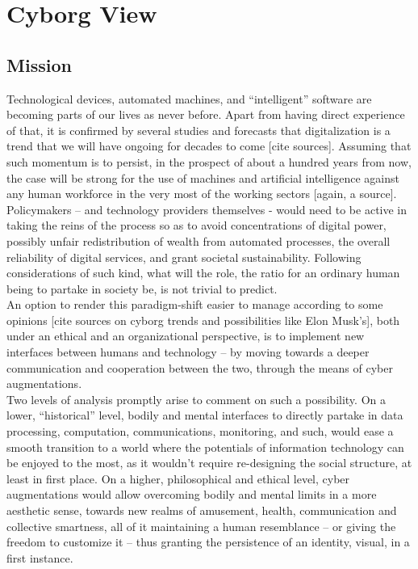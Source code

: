\chapter*{Cyborg View}
\label{cha:cyborg}

\section*{Mission}
\label{sec:mission}

Technological devices, automated machines, and “intelligent” software are becoming parts of our lives as never before. Apart from having direct experience of that, it is confirmed by several studies and forecasts that digitalization is a trend that we will have ongoing for decades to come [cite sources]. Assuming that such momentum is to persist, in the prospect of about a hundred years from now, the case will be strong for the use of machines and artificial intelligence against any human workforce in the very most of the working sectors [again, a source]. Policymakers – and technology providers themselves - would need to be active in taking the reins of the process so as to avoid concentrations of digital power, possibly unfair redistribution of wealth from automated processes, the overall reliability of digital services, and grant societal sustainability. Following considerations of such kind, what will the role, the ratio for an ordinary human being to partake in society be, is not trivial to predict.\\

An option to render this paradigm-shift easier to manage according to some opinions [cite sources on cyborg trends and possibilities like Elon Musk’s], both under an ethical and an organizational perspective, is to implement new interfaces between humans and technology – by moving towards a deeper communication and cooperation between the two, through the means of cyber augmentations.\\

Two levels of analysis promptly arise to comment on such a possibility. On a lower, “historical” level, bodily and mental interfaces to directly partake in data processing, computation, communications, monitoring, and such, would ease a smooth transition to a world where the potentials of information technology can be enjoyed to the most, as it wouldn’t require re-designing the social structure, at least in first place. On a higher, philosophical and ethical level, cyber augmentations would allow overcoming bodily and mental limits in a more aesthetic sense, towards new realms of amusement, health, communication and collective smartness, all of it maintaining a human resemblance – or giving the freedom to customize it – thus granting the persistence of an identity, visual, in a first instance.\\

